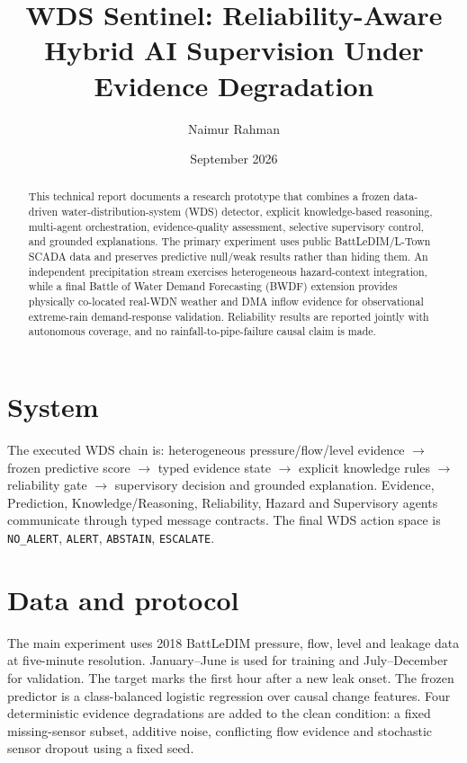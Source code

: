 \documentclass[11pt]{article}
\title{WDS Sentinel: Reliability-Aware Hybrid AI Supervision Under Evidence Degradation}
\author{Naimur Rahman}
\date{September 2026}
\begin{document}
\maketitle

\begin{abstract}
This technical report documents a research prototype that combines a frozen data-driven water-distribution-system (WDS) detector, explicit knowledge-based reasoning, multi-agent orchestration, evidence-quality assessment, selective supervisory control, and grounded explanations. The primary experiment uses public BattLeDIM/L-Town SCADA data and preserves predictive null/weak results rather than hiding them. An independent precipitation stream exercises heterogeneous hazard-context integration, while a final Battle of Water Demand Forecasting (BWDF) extension provides physically co-located real-WDN weather and DMA inflow evidence for observational extreme-rain demand-response validation. Reliability results are reported jointly with autonomous coverage, and no rainfall-to-pipe-failure causal claim is made.
\end{abstract}

\section{System}
The executed WDS chain is: heterogeneous pressure/flow/level evidence $\rightarrow$ frozen predictive score $\rightarrow$ typed evidence state $\rightarrow$ explicit knowledge rules $\rightarrow$ reliability gate $\rightarrow$ supervisory decision and grounded explanation. Evidence, Prediction, Knowledge/Reasoning, Reliability, Hazard and Supervisory agents communicate through typed message contracts. The final WDS action space is \texttt{NO\_ALERT}, \texttt{ALERT}, \texttt{ABSTAIN}, \texttt{ESCALATE}.

\section{Data and protocol}
The main experiment uses 2018 BattLeDIM pressure, flow, level and leakage data at five-minute resolution. January--June is used for training and July--December for validation. The target marks the first hour after a new leak onset. The frozen predictor is a class-balanced logistic regression over causal change features. Four deterministic evidence degradations are added to the clean condition: a fixed missing-sensor subset, additive noise, conflicting flow evidence and stochastic sensor dropout using a fixed seed.
\end{document}
